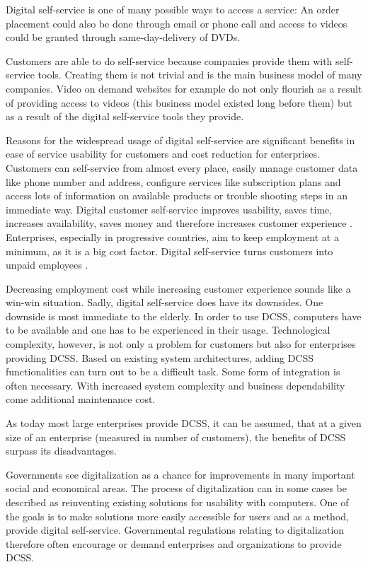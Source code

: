 \documentclass[
     12pt,         %
     a4paper,      %
     BCOR10mm,     %
     DIV14,        %
aragraph skip instad of paragraph indent
     ]{scrreprt}
\begin{document}
Digital self-service is one of many possible ways to access a service: An order placement could also be done through email or phone call and access to videos could be granted through same-day-delivery of DVDs.

Customers are able to do self-service because companies provide them with self-service tools. Creating them is not trivial and is the main business model of many companies. Video on demand websites for example do not only flourish as a result of providing access to videos (this business model existed long before them) but as a result of the digital self-service tools they provide.

Reasons for the widespread usage of digital self-service are significant benefits in ease of service usability for customers and cost reduction for enterprises. Customers can self-service from almost every place, easily manage customer data like phone number and address, configure services like subscription plans and access lots of information on available products or trouble shooting steps in an immediate way. Digital customer self-service improves usability, saves time, increases availability, saves money and therefore increases customer experience
\cite[cf. 243]{CSSInternetAge}.
Enterprises, especially in progressive countries, aim to keep employment at a minimum, as it is a big cost factor. Digital self-service turns customers into unpaid employees \cite{served}.

Decreasing employment cost while increasing customer experience sounds like a win-win situation. Sadly, digital self-service does have its downsides. One downside is most immediate to the elderly. In order to use DCSS, computers have to be available and one has to be experienced in their usage. Technological complexity, however, is not only a problem for customers but also for enterprises providing DCSS. Based on existing system architectures, adding DCSS functionalities can turn out to be a difficult task. Some form of integration is often necessary. With increased system complexity and business dependability come additional maintenance cost.

As today most large enterprises provide DCSS, it can be assumed, that at a given size of an enterprise (measured in number of customers), the benefits of DCSS surpass its disadvantages.

Governments see digitalization as a chance for improvements in many important social and economical areas. The process of digitalization can in some cases be described as reinventing existing solutions for usability with computers. One of the goals is to make solutions more easily accessible for users and as a method, provide digital self-service. Governmental regulations relating to digitalization therefore often encourage or demand enterprises and organizations to provide DCSS.
\end{document}
